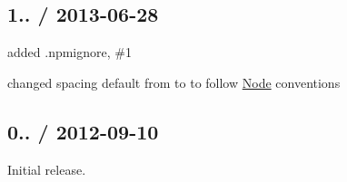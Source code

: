 \subsection*{1.. / 2013-\/06-\/28 }


\begin{DoxyItemize}
\item added {\ttfamily .npmignore}, \#1
\item changed spacing default from {} to {} to follow \mbox{\hyperlink{classNode}{Node}} conventions
\end{DoxyItemize}

\subsection*{0.. / 2012-\/09-\/10 }


\begin{DoxyItemize}
\item Initial release. 
\end{DoxyItemize}